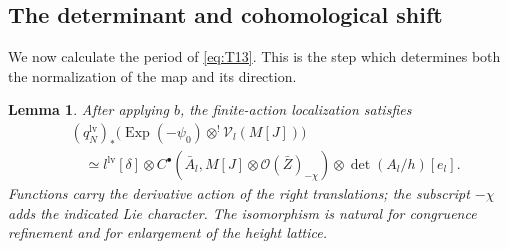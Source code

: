 \documentclass[11pt]{article}
\numberwithin{equation}{section}
\newtheorem{lemma}[theorem]{Lemma}
\theoremstyle{definition}
\theoremstyle{remark}
\begin{document}
\subsection{The determinant and cohomological shift}

We now calculate the period of \eqref{eq:T13}.  This is the step
which determines both the normalization of the map and its direction.

\begin{lemma}\label{lem:unipotent-finite-period}
After applying $b$, the finite-action localization satisfies
\begin{equation}\label{eq:T14}
 \begin{aligned}
 &(q_N^{\mathrm{lv}})_*
   \bigl(\operatorname{Exp}(-\psi_0)
                 \otimes^!\mathcal V_l(M[J])\bigr)\\
 &\quad\simeq l^{\mathrm{lv}}[\delta]\otimes
 C^\bullet\!\left(\bar A_l,
    M[J]\otimes\mathcal O(\bar Z)_{-\chi}\right)
       \otimes\det(A_l/h)[e_l].
 \end{aligned}
\end{equation}
Functions carry the derivative action of the right translations;
the subscript $-\chi$ adds the indicated Lie character.  The
isomorphism is natural for congruence refinement and for enlargement
of the height lattice.
\end{lemma}
\end{document}
